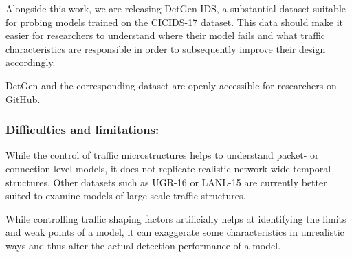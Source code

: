 \documentclass[runningheads]{llncs}
\begin{document}
Alongside this work, we are releasing DetGen-IDS, a substantial dataset suitable for probing models trained on the CICIDS-17 dataset. This data should make it easier for researchers to understand where their model fails and what traffic characteristics are responsible in order to subsequently improve their design accordingly.

DetGen and the corresponding dataset are openly accessible for researchers on GitHub.




\subsubsection*{Difficulties and limitations:}
While the control of traffic microstructures helps to understand packet- or connection-level models, it does not replicate realistic network-wide temporal structures. Other datasets such as UGR-16 \cite{macia2018ugr} or LANL-15 \cite{turcotte17} are currently better suited to examine models of large-scale traffic structures.

While controlling traffic shaping factors artificially helps at identifying the limits and weak points of a model, it can exaggerate some characteristics in unrealistic ways and thus alter the actual detection performance of a model. 
\end{document}

